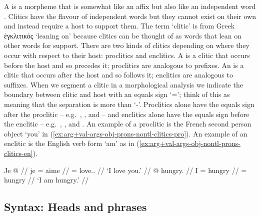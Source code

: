 A  is a morpheme that is somewhat like an affix but also like an independent word \parencite[166]{booij:2007}.
Clitics have the flavour of independent words but they cannot exist on their own and instead require a host to support them.
The term ‘clitic’ is from Greek ἐγκλιτικός  ‘leaning on’ because clitics can be thought of as words that lean on other words for support.
There are two kinds of clitics depending on where they occur with respect to their host: proclitics and enclitics.
A  is a clitic that occurs before the host and so precedes it; proclitics are analogous to prefixes.
An  is a clitic that occurs after the host and so follows it; enclitics are analogous to suffixes.
When we segment a clitic in a morphological analysis we indicate the boundary between clitic and host with an equals sign ‘=’; think of this as meaning that the separation is more than ‘-’.
Proclitics alone have the equals sign after the proclitic – e.g.\ , , and  – and enclitics alone have the equals sign before the enclitic – e.g.\ , , and .
An example of a proclitic is the French second person object  ‘you’ in (\ref{ex:arg+val-args-obj-prons-nontl-clitics-pro}).
An example of an enclitic is the English verb form  ‘am’ as in (\ref{ex:arg+val-args-obj-nontl-prons-clitics-en}).

\pex\label{exx:arg+val-args-obj-prons-nontl-clitics}%
\a\label{ex:arg+val-args-obj-prons-nontl-clitics-pro}%
%
\begingl
	\gla	Je  @ {} //
	\glb	je = aime //
	\glc	{} = love.. //
	\glft	‘I love you.’
		//
\endgl
\a\label{ex:arg+val-args-obj-nontl-prons-clitics-en}%
%
\begingl
	\gla	{} @ {} hungry. //
	\glb	I = hungry //
	\glc	{} = hungry //
	\glft	‘I am hungry.’
		//
\endgl
\xe


\subsection{Syntax: Heads and phrases}\label{sec:intro-ling-synx}




